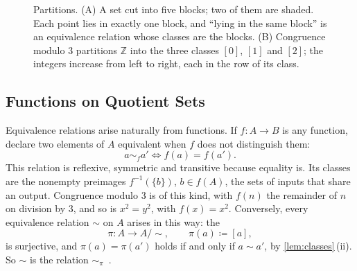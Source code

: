 \begin{figure}
\hfill
{}
\caption{Partitions. (A) A set cut into five blocks; two of them are shaded. Each point lies in exactly one block, and ``lying in the same block'' is an equivalence relation whose classes are the blocks. (B) Congruence modulo $3$ partitions $\mathbb Z$ into the three classes $[0]$, $[1]$ and $[2]$; the integers increase from left to right, each in the row of its class.}
\label{fig:partition}
\end{figure}

\subsection{Functions on Quotient Sets}

Equivalence relations arise naturally from functions. If $f\colon A\to B$ is any function, declare two elements of $A$ equivalent when $f$ does not distinguish them:
\[
a\sim_f a'\iff f(a)=f(a').
\]
This relation is reflexive, symmetric and transitive because equality is. Its classes are the nonempty preimages $f^{-1}(\{b\})$, $b\in f(A)$, the sets of inputs that share an output. Congruence modulo $3$ is of this kind, with $f(n)$ the remainder of $n$ on division by $3$, and so is $x^2=y^2$, with $f(x)=x^2$. Conversely, every equivalence relation $\sim$ on $A$ arises in this way: the 
\[
\pi\colon A\to A/{\sim},\qquad\pi(a)\coloneqq[a],
\]
is surjective, and $\pi(a)=\pi(a')$ holds if and only if $a\sim a'$, by \cref{lem:classes}\,(ii). So $\sim$ is the relation $\sim_\pi$~\cite{halmos1960naive}.

